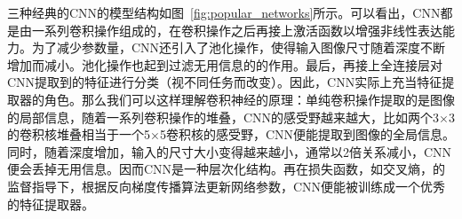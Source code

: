 三种经典的CNN的模型结构如图~\ref{fig:popular_networks}所示。可以看出，CNN都是由一系列卷积操作组成的，在卷积操作之后再接上激活函数以增强非线性表达能力。为了减少参数量，CNN还引入了池化操作，使得输入图像尺寸随着深度不断增加而减小。池化操作也起到过滤无用信息的的作用。最后，再接上全连接层对CNN提取到的特征进行分类（视不同任务而改变）。因此，CNN实际上充当特征提取器的角色。那么我们可以这样理解卷积神经的原理：单纯卷积操作提取的是图像的局部信息，随着一系列卷积操作的堆叠，CNN的感受野越来越大，比如两个3$\times$3的卷积核堆叠相当于一个5$\times$5卷积核的感受野，CNN便能提取到图像的全局信息。同时，随着深度增加，输入的尺寸大小变得越来越小，通常以2倍关系减小，CNN便会丢掉无用信息。因而CNN是一种层次化结构。再在损失函数，如交叉熵，的监督指导下，根据反向梯度传播算法更新网络参数，CNN便能被训练成一个优秀的特征提取器。


